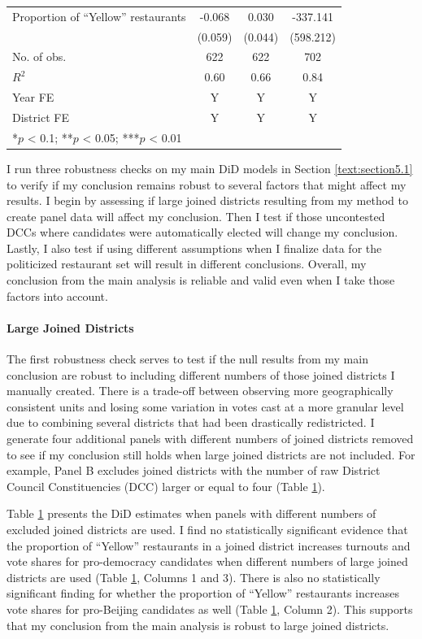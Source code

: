 \documentclass[letterpaper, 12pt]{article}
\begin{document}
\begin{table}[!h]
\begin{tabular}{lccc}
Proportion of ``Yellow'' restaurants & -0.068 & 0.030 & -337.141\\
 & (0.059) & (0.044) & (598.212)\\
No. of obs. & 622 & 622 & 702\\
$R^2$ & 0.60 & 0.66 & 0.84\\
\midrule
Year FE & Y & Y & Y\\
District FE & Y & Y & Y\\
\bottomrule
\multicolumn{4}{l}{\rule{0pt}{1em}*$p$ < 0.1; **$p$ < 0.05; ***$p$ < 0.01}\\
\end{tabular}
\label{rc:joined_districts}
\endgroup{}
\end{table}


I run three robustness checks on my main DiD models in Section \ref{text:section5.1} to verify if my conclusion remains robust to several factors that might affect my results. I begin by assessing if large joined districts resulting from my method to create panel data will affect my conclusion. Then I test if those uncontested DCCs where candidates were automatically elected will change my conclusion. Lastly, I also test if using different assumptions when I finalize data for the politicized restaurant set will result in different conclusions. Overall, my conclusion from the main analysis is reliable and valid even when I take those factors into account.

\paragraph*{Large Joined Districts}
The first robustness check serves to test if the null results from my main conclusion are robust to including different numbers of those joined districts I manually created. There is a trade-off between observing more geographically consistent units and losing some variation in votes cast at a more granular level due to combining several districts that had been drastically redistricted. I generate four additional panels with different numbers of joined districts removed to see if my conclusion still holds when large joined districts are not included. For example, Panel B excludes joined districts with the number of raw District Council Constituencies (DCC) larger or equal to four (Table \ref{rc:joined_districts}). 

Table \ref{rc:joined_districts} presents the DiD estimates when panels with different numbers of excluded joined districts are used. I find no statistically significant evidence that the proportion of ``Yellow'' restaurants in a joined district increases turnouts and vote shares for pro-democracy candidates when different numbers of large joined districts are used (Table \ref{rc:joined_districts}, Columns 1 and 3). There is also no statistically significant finding for whether the proportion of ``Yellow'' restaurants increases vote shares for pro-Beijing candidates as well (Table \ref{rc:joined_districts}, Column 2). This supports that my conclusion from the main analysis is robust to large joined districts.
\end{document}
